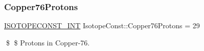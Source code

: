 \subsubsection{\texorpdfstring{Copper76\+Protons}{Copper76Protons}}
{\footnotesize\ttfamily \mbox{\hyperlink{group___isotope_const-_macros_ga5f18360b3e99483a35c32d789e62621c}{I\+S\+O\+T\+O\+P\+E\+C\+O\+N\+S\+T\+\_\+\+I\+NT}} Isotope\+Const\+::\+Copper76\+Protons = 29}

\$ \$ Protons in Copper-\/76. 